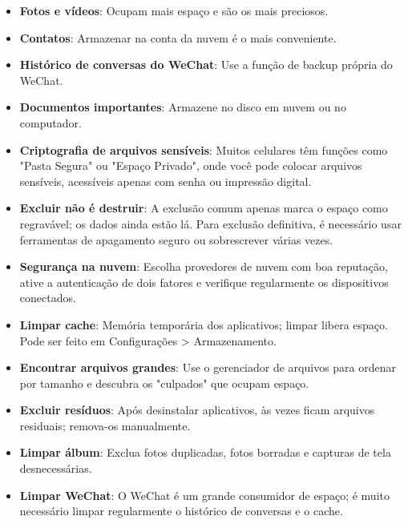
\begin{itemize}
  \item \textbf{Fotos e vídeos}: Ocupam mais espaço e são os mais preciosos.
  \item \textbf{Contatos}: Armazenar na conta da nuvem é o mais conveniente.
  \item \textbf{Histórico de conversas do WeChat}: Use a função de backup própria do WeChat.
  \item \textbf{Documentos importantes}: Armazene no disco em nuvem ou no computador.
\end{itemize}


\begin{itemize}
  \item \textbf{Criptografia de arquivos sensíveis}: Muitos celulares têm funções como "Pasta Segura" ou "Espaço Privado", onde você pode colocar arquivos sensíveis, acessíveis apenas com senha ou impressão digital.
  \item \textbf{Excluir não é destruir}: A exclusão comum apenas marca o espaço como regravável; os dados ainda estão lá. Para exclusão definitiva, é necessário usar ferramentas de apagamento seguro ou sobrescrever várias vezes.
  \item \textbf{Segurança na nuvem}: Escolha provedores de nuvem com boa reputação, ative a autenticação de dois fatores e verifique regularmente os dispositivos conectados.
\end{itemize}


\begin{itemize}
  \item \textbf{Limpar cache}: Memória temporária dos aplicativos; limpar libera espaço. Pode ser feito em Configurações > Armazenamento.
  \item \textbf{Encontrar arquivos grandes}: Use o gerenciador de arquivos para ordenar por tamanho e descubra os "culpados" que ocupam espaço.
  \item \textbf{Excluir resíduos}: Após desinstalar aplicativos, às vezes ficam arquivos residuais; remova-os manualmente.
  \item \textbf{Limpar álbum}: Exclua fotos duplicadas, fotos borradas e capturas de tela desnecessárias.
  \item \textbf{Limpar WeChat}: O WeChat é um grande consumidor de espaço; é muito necessário limpar regularmente o histórico de conversas e o cache.
\end{itemize}

